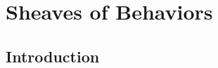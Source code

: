 \documentclass[DynamicalBook]{subfiles}
\begin{document}
%


\setcounter{chapter}{6}%

\chapter{Sheaves of Behaviors}\label{chapter.6} 

\section{Introduction}
\end{document}
